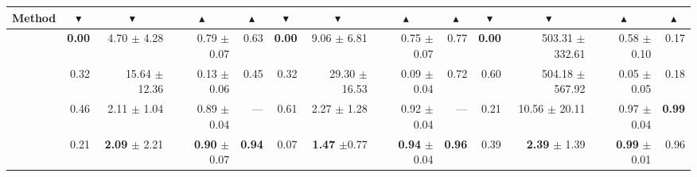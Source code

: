 \begin{table}[h]
{\begin{tabular}{lrrrrrrrrrrrr}
Method & \multicolumn{1}{c}{$\blacktriangledown$} &\multicolumn{1}{c}{$\blacktriangledown$} &\multicolumn{1}{c}{$\blacktriangle$} & \multicolumn{1}{c}{$\blacktriangle$} & \multicolumn{1}{c}{$\blacktriangledown$} &\multicolumn{1}{c}{$\blacktriangledown$} &\multicolumn{1}{c}{$\blacktriangle$} & \multicolumn{1}{c}{$\blacktriangle$} & \multicolumn{1}{c}{$\blacktriangledown$} &\multicolumn{1}{c}{$\blacktriangledown$} &\multicolumn{1}{c}{$\blacktriangle$} & \multicolumn{1}{c}{$\blacktriangle$} \\
\midrule
\baserand{}               & \textbf{0.00}                     & 4.70   $\pm$       4.28                    & 0.79     $\pm$ 0.07                           & 0.63                               & \textbf{0.00}                     & 9.06    $\pm$ 6.81                          & 0.75      $\pm$ 0.07                          & 0.77                               & \textbf{0.00}                     & 503.31   $\pm$ 332.61                         & 0.58   $\pm$ 0.10                             & 0.17                              \\
\basekeep{}                 & 0.32                              & 15.64      $\pm$ 12.36                       & 0.13       $\pm$ 0.06                         & 0.45                               & 0.32                              & 29.30      $\pm$16.53                       & 0.09      $\pm$ 0.04                          & 0.72                               & 0.60                              & 504.18    $\pm$ 567.92                        & 0.05      $\pm$ 0.05                          & 0.18                              \\
\baserm{}              & 0.46                              & 2.11          $\pm$ 1.04                    & 0.89         $\pm$ 0.04                       & ---                                  & 0.61                              & 2.27         $\pm$ 1.28                     & 0.92      $\pm$ 0.04                          & ---                                  & 0.21                              & 10.56      $\pm$ 20.11                       & 0.97     $\pm$ 0.04                           & \textbf{0.99}                     \\



\midrule
\OurShort{}               & 0.21                              & \textbf{2.09}     $\pm$ 2.21                & \textbf{0.90}    $\pm$ 0.07                   & \textbf{0.94}                      & 0.07                              & \textbf{1.47}    $\pm$0.77                 & \textbf{0.94}    $\pm$ 0.04                   & \textbf{0.96}                      & 0.39                              & \textbf{2.39}    $\pm$ 1.39                 & \textbf{0.99}      $\pm$ 0.01                 & 0.96                 \\
\bottomrule
\end{tabular}}
\end{table}




